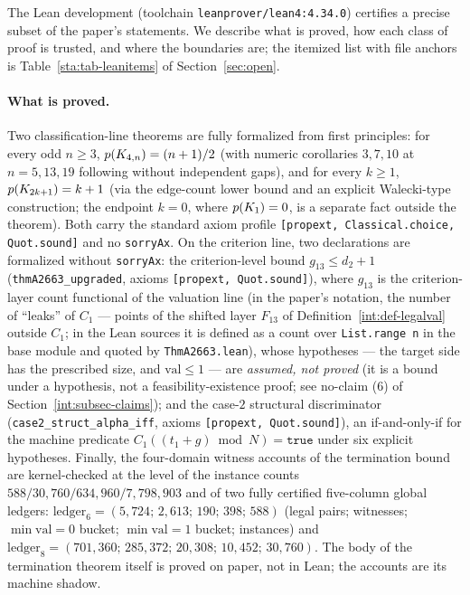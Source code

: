 The Lean development (toolchain \texttt{leanprover/lean4:4.34.0}) certifies
a precise subset of the paper's statements. We describe what is proved, how
each class of proof is trusted, and where the boundaries are; the
itemized list with file anchors is Table~\ref{sta:tab-leanitems} of
Section~\ref{sec:open}.

\paragraph{What is proved.} Two classification-line theorems are fully
formalized from first principles: for every odd $n\ge3$,
$p(K_{4,n})=(n+1)/2$ (with numeric corollaries $3,7,10$ at
$n=5,13,19$ following without independent gaps), and for every $k\ge1$,
$p(K_{2k+1})=k+1$ (via the edge-count lower bound and an explicit
Walecki-type construction; the endpoint $k=0$, where $p(K_1)=0$, is a
separate fact outside the theorem). Both carry the standard axiom profile
\texttt{[propext, Classical.choice, Quot.sound]} and no \texttt{sorryAx}.
On the criterion line, two declarations are formalized without
\texttt{sorryAx}: the criterion-level bound $g_{13}\le d_2+1$
(\texttt{thmA2663\_upgraded}, axioms \texttt{[propext, Quot.sound]}), where
$g_{13}$ is the criterion-layer count functional of the valuation line
(in the paper's notation, the number of ``leaks'' of $C_1$ --- points of
the shifted layer $F_{13}$ of Definition~\ref{int:def-legalval} outside
$C_1$; in the Lean sources it is defined as a count over
\texttt{List.range n} in the base module and quoted by
\texttt{ThmA2663.lean}), whose
hypotheses --- the target side has the prescribed size, and
$\mathrm{val}\le1$ --- are \emph{assumed, not proved} (it is a bound under a
hypothesis, not a feasibility-existence proof; see no-claim
\textup{(6)} of Section~\ref{int:subsec-claims}); and the case-$2$
structural discriminator (\texttt{case2\_struct\_alpha\_iff}, axioms
\texttt{[propext, Quot.sound]}), an if-and-only-if for the machine
predicate $C_1((t_1+g)\bmod N)=\texttt{true}$ under six explicit
hypotheses. Finally, the four-domain witness accounts of the termination
bound are kernel-checked at the level of the instance counts
$588/30{,}760/634{,}960/7{,}798{,}903$ and of two fully certified
five-column global ledgers:
$\mathrm{ledger}_6=(5{,}724;\,2{,}613;\,190;\,398;\,588)$
(legal pairs; witnesses; $\min\mathrm{val}=0$ bucket; $\min\mathrm{val}=1$
bucket; instances) and
$\mathrm{ledger}_8=(701{,}360;\,285{,}372;\,20{,}308;\,10{,}452;\,30{,}760)$.
The body of the termination theorem itself is proved on paper, not in Lean;
the accounts are its machine shadow.


